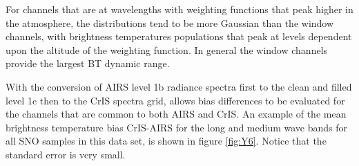 \documentclass[twocolumn,10pt]{article}
\begin{document}
For channels that are at wavelengths with weighting functions that peak higher in the atmosphere, the distributions tend to be more Gaussian than the window channels, with brightness temperatures populations that peak at levels dependent upon the altitude of the weighting function. In general the window channels provide the largest BT dynamic range.





With the conversion of AIRS level 1b radiance spectra first to the clean and filled level 1c
then to the CrIS spectra grid, allows bias differences to be evaluated for the
channels that are common to both AIRS and CrIS. An example of the mean brightness
temperature bias CrIS-AIRS for the long and medium wave bands for all SNO samples in this
data set, is shown in figure \ref{fig:Y6}. Notice that the standard error is very small.
\end{document}
